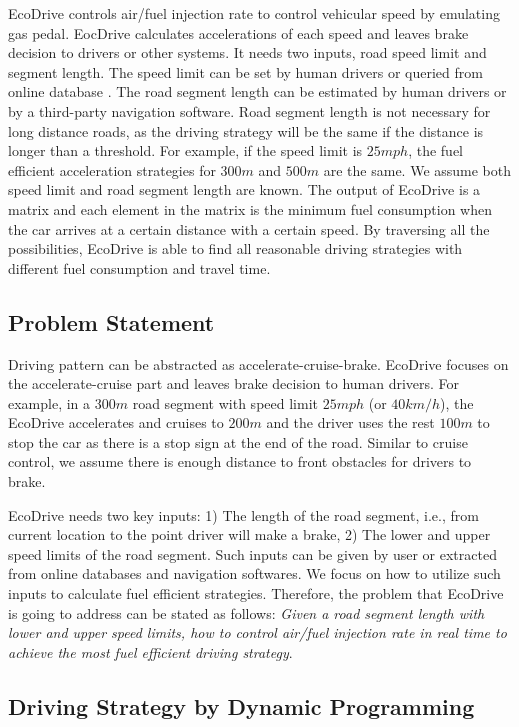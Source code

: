 
EcoDrive controls air/fuel injection rate to control vehicular speed 
by emulating gas pedal. 
EocDrive calculates accelerations of each speed and leaves
brake decision to drivers or other systems. 
It needs two inputs, road speed limit and segment length. 
The speed limit can be set by human drivers or queried from online database \cite{speedlimit}. 
The road segment length can be estimated by human drivers or
by a third-party navigation software. 
Road segment length is not necessary for long distance roads, 
as the driving strategy will be the same if the distance is longer than
a threshold.
For example, if the speed limit is $25mph$, 
the fuel efficient acceleration strategies for $300m$ and $500m$ are the same. 
We assume both speed limit and road segment length are known. 
The output of EcoDrive is a matrix and each element in the matrix is the minimum
fuel consumption when the car arrives at a certain distance with a certain speed. 
By traversing all the possibilities, EcoDrive is able to find all reasonable
driving strategies with different fuel consumption and travel time. 


\subsection{Problem Statement}

Driving pattern can be abstracted as accelerate-cruise-brake.  
EcoDrive focuses on the accelerate-cruise part and 
leaves brake decision to human drivers. 
For example, in a $300m$ road segment with speed limit $25mph$ (or $40km/h$), 
the EcoDrive accelerates and cruises to $200m$ and 
the driver uses the rest $100m$ to stop the car as
there is a stop sign at the end of the road. 
Similar to cruise control, we assume there is enough distance
to front obstacles for drivers to brake.


EcoDrive needs two key inputs: 1) The length of the road segment, 
i.e., from current location to the point driver will make a brake, 
2) The lower and upper speed limits of the road segment. 
Such inputs can be given by user or extracted from online databases and navigation
softwares.
We focus on how to utilize such inputs to calculate
fuel efficient strategies.  
Therefore, the problem that EcoDrive is going to address can
be stated as follows:
\emph{Given a road segment length with lower and upper speed limits,
how to control air/fuel injection rate in real time to achieve the most fuel efficient driving strategy}.  


\subsection{Driving Strategy by Dynamic Programming}


